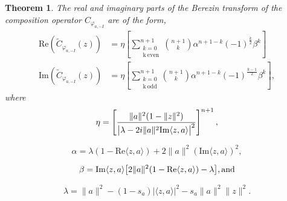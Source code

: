 \documentclass{amsart}
\newtheorem{theorem}{Theorem}
\theoremstyle{remark}
\begin{document}
\begin{theorem}
    The real and imaginary parts of the Berezin transform of the composition operator $C_{\varphi_{a,-I}}$ are of the form,
    \begin{align*}
        \mathrm{Re}( \widetilde{C}_{\varphi_{a,-I}}(z)) &= \eta \left[
        \sum_{\substack{k=0 \\ \mathrm{k \ even}}}^{n+1} {n + 1 \choose k} \alpha^{n+1-k} (-1)^{\frac{k}{2}} \beta^{k}\right] \\
        \mathrm{Im}( \widetilde{C}_{\varphi_{a,-I}}(z)) &= \eta \left[
        \sum_{\substack{k=0 \\ \mathrm{k \ odd}}}^{n+1} {n + 1 \choose k} \alpha^{n+1-k} (-1)^{\frac{k-1}{2}} \beta^{k}\right],     
    \end{align*}
     where
    \[\eta=\left[\frac{\|a\|^{2}(1 - \|z\|^{2})}{\big{|} \lambda - 2i\|a\|^{2}\mathrm{Im}\langle z,a \rangle\big{|}^2}\right]^{n+1},\]
    
    \[\alpha=\lambda(1 - \mathrm{Re}\langle z,a\rangle)  + 2\|a\|^{2}(\mathrm{Im}\langle z,a \rangle)^2,\]
    
    \[\beta=\mathrm{Im}\langle z,a \rangle\big{[}2\|a\|^2(1 - \mathrm{Re}\langle z,a\rangle)-\lambda \big{]}, \text{and}\]

    \[\lambda=\|a\|^{2} - (1-s_a)|\langle z,a \rangle|^2 - s_{a}\|a\|^2\|z\|^2.\]
\end{theorem}
\end{document}
